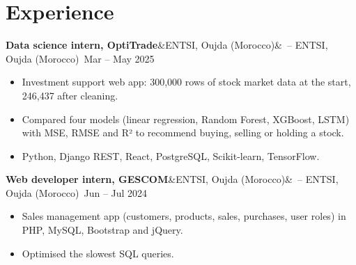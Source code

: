 \documentclass[10pt]{article}
\newcommand{\entree}[3]{\par\noindent\textbf{#1}\ifx&#2&\else\ {\color{gris}-- #2}\fi\ \hfill{\color{gris}#3}\par\vspace{1pt}}
\begin{document}
\section*{Experience}
\entree{Data science intern, OptiTrade}{ENTSI, Oujda (Morocco)}{Mar -- May 2025}
\begin{itemize}
  \item Investment support web app: 300,000 rows of stock market data at the start, 246,437 after cleaning.
  \item Compared four models (linear regression, Random Forest, XGBoost, LSTM) with MSE, RMSE and R² to recommend buying, selling or holding a stock.
  \item Python, Django REST, React, PostgreSQL, Scikit-learn, TensorFlow.
\end{itemize}
\vspace{3pt}
\entree{Web developer intern, GESCOM}{ENTSI, Oujda (Morocco)}{Jun -- Jul 2024}
\begin{itemize}
  \item Sales management app (customers, products, sales, purchases, user roles) in PHP, MySQL, Bootstrap and jQuery.
  \item Optimised the slowest SQL queries.
\end{itemize}
\end{document}
